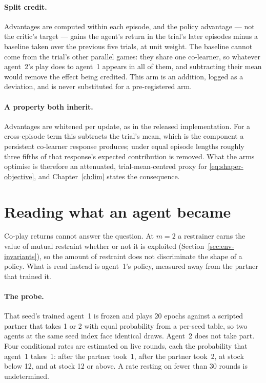 \paragraph{Split credit.}
Advantages are computed within each episode, and the policy advantage --- not
the critic's target --- gains the agent's return in the trial's later
episodes minus a baseline taken over the previous five trials, at unit
weight.
The baseline cannot come from the trial's other parallel games: they share
one co-learner, so whatever agent~2's play does to agent~1 appears in all of
them, and subtracting their mean would remove the effect being credited.
This arm is an addition, logged as a deviation, and is never substituted for
a pre-registered arm.

\paragraph{A property both inherit.}
Advantages are whitened per update, as in the released implementation.
For a cross-episode term this subtracts the trial's mean, which is the
component a persistent co-learner response produces; under equal episode
lengths roughly three fifths of that response's expected contribution is
removed.
What the arms optimise is therefore an attenuated, trial-mean-centred proxy
for \eqref{eq:shaper-objective}, and Chapter~\ref{ch:lim} states the
consequence.

\section{Reading what an agent became}
\label{sec:method-probe}

Co-play returns cannot answer the question.
At \(m=2\) a restrainer earns the value of mutual restraint whether or not
it is exploited (Section~\ref{sec:env-invariants}), so the amount of
restraint does not discriminate the shape of a policy.
What is read instead is agent~1's policy, measured away from the partner
that trained it.

\paragraph{The probe.}
That seed's trained agent~1 is frozen and plays 20 epochs against a scripted
partner that takes 1 or 2 with equal probability from a per-seed table, so
two agents at the same seed index face identical draws.
Agent~2 does not take part.
Four conditional rates are estimated on live rounds, each the probability
that agent~1 takes~1: after the partner took~1, after the partner took~2,
at stock below 12, and at stock 12 or above.
A rate resting on fewer than 30 rounds is undetermined.

